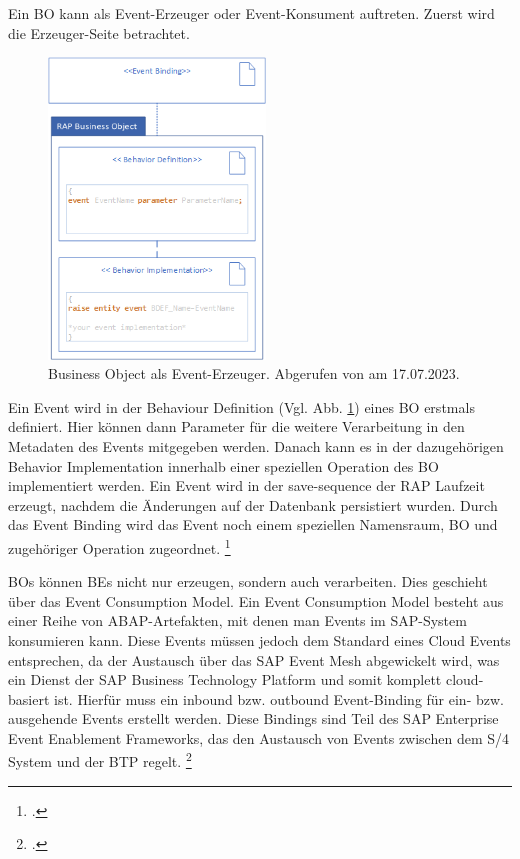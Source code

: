 Ein BO kann als Event-Erzeuger oder Event-Konsument auftreten. Zuerst wird die Erzeuger-Seite betrachtet.

\begin{figure}[H]
 \centering
 \includegraphics[height=8cm]{Bilder/Business-Events_BO-as-event-consumer.png}
 \caption[Business Object als Event-Erzeuger]{Business Object als Event-Erzeuger. Abgerufen von \cite{sap_business-events_2023} am 17.07.2023.}
 \label{fig:iso_norm_Business_Events}
\end{figure}

Ein Event wird in der Behaviour Definition (Vgl. Abb. \ref{fig:iso_norm_Business_Events}) eines BO erstmals definiert. Hier können dann Parameter für die weitere Verarbeitung in den Metadaten des Events mitgegeben werden. Danach kann es in der dazugehörigen Behavior Implementation innerhalb einer speziellen Operation des BO implementiert werden. Ein Event wird in der save-sequence der RAP Laufzeit erzeugt, nachdem die Änderungen auf der Datenbank persistiert wurden. Durch das Event Binding wird das Event noch einem speziellen Namensraum, BO und zugehöriger Operation zugeordnet. \footcite[Vgl.][]{sap_business-events_2023}

BOs können BEs nicht nur erzeugen, sondern auch verarbeiten. Dies geschieht über das Event Consumption Model. Ein Event Consumption Model besteht aus einer Reihe von ABAP-Artefakten, mit denen man Events im SAP-System konsumieren kann. Diese Events müssen jedoch dem Standard eines Cloud Events entsprechen, da der Austausch über das SAP Event Mesh abgewickelt wird, was ein Dienst der SAP Business Technology Platform und somit komplett cloud-basiert ist. Hierfür muss ein inbound bzw. outbound Event-Binding für ein- bzw. ausgehende Events erstellt werden. Diese Bindings sind Teil des SAP Enterprise Event Enablement Frameworks, das den Austausch von Events zwischen dem S/4 System und der BTP regelt. \footcite[Vgl.][]{sap_creating_2022}

